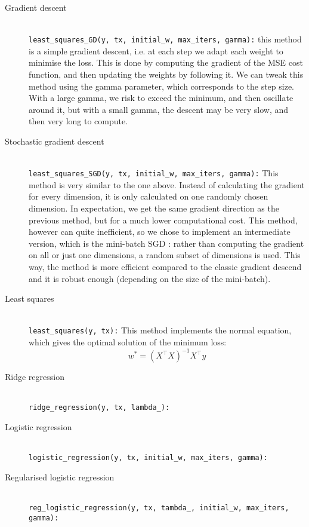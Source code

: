 \documentclass[10pt,conference,compsocconf]{IEEEtran}
\newcommand{\code}[1]{\texttt{#1}} %
\begin{document}
\begin{description}

\item[Gradient descent] \ \\
\code{least\_squares\_GD(y, tx, initial\_w, max\_iters, gamma):} this method is a simple gradient descent, i.e. at each step we adapt each weight to minimise the loss. This is done by computing the gradient of the MSE cost function, and then updating the weights by following it. We can tweak this method using the gamma parameter, which corresponds to the step size. With a large gamma, we risk to exceed the minimum, and then oscillate around it, but with a small gamma, the descent may be very slow, and then very long to compute.

\item[Stochastic gradient descent] \ \\
\code{least\_squares\_SGD(y, tx, initial\_w, max\_iters, gamma):} This method is very similar to the one above. Instead of calculating the gradient for every dimension, it is only calculated on one randomly chosen dimension. In expectation, we get the same gradient direction as the previous method, but for a much lower computational cost. This method, however can quite inefficient, so we chose to implement an intermediate version, which is the mini-batch SGD : rather than computing the gradient on all or just one dimensions, a random subset of dimensions is used. This way, the method is more efficient compared to the classic gradient descend and it is robust enough (depending on the size of the mini-batch).

\item[Least squares] \ \\
\code{least\_squares(y, tx):} This method implements the normal equation, which gives the optimal solution of the minimum loss: $$w^* = (X^{\top}X)^{-1}X^{\top}y$$

\item[Ridge regression] \ \\
\code{ridge\_regression(y, tx, lambda\_):}

\item[Logistic regression] \ \\
\code{logistic\_regression(y, tx, initial\_w, max\_iters, gamma):}

\item[Regularised logistic regression] \ \\
\code{reg\_logistic\_regression(y, tx, tambda\_, initial\_w, max\_iters, gamma):}

\end{description}
\end{document}

